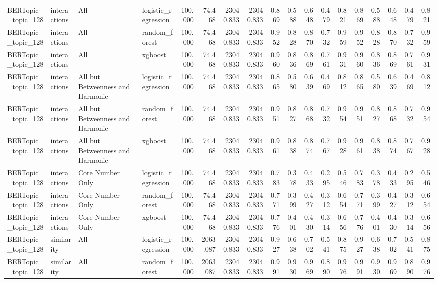 \begin{tabular}{llllrrrrrrrrrrrrrr}
BERTopic\_topic\_128 & interactions & All & logistic\_regression & 100.000 & 74.468 & 23040.833 & 23040.833 & 0.869 & 0.588 & 0.648 & 0.479 & 0.821 & 0.869 & 0.588 & 0.648 & 0.479 & 0.821 \\
BERTopic\_topic\_128 & interactions & All & random\_forest & 100.000 & 74.468 & 23040.833 & 23040.833 & 0.952 & 0.828 & 0.870 & 0.732 & 0.959 & 0.952 & 0.828 & 0.870 & 0.732 & 0.959 \\
BERTopic\_topic\_128 & interactions & All & xgboost & 100.000 & 74.468 & 23040.833 & 23040.833 & 0.960 & 0.836 & 0.869 & 0.761 & 0.931 & 0.960 & 0.836 & 0.869 & 0.761 & 0.931 \\
BERTopic\_topic\_128 & interactions & All but Betweenness and Harmonic & logistic\_regression & 100.000 & 74.468 & 23040.833 & 23040.833 & 0.865 & 0.580 & 0.639 & 0.469 & 0.812 & 0.865 & 0.580 & 0.639 & 0.469 & 0.812 \\
BERTopic\_topic\_128 & interactions & All but Betweenness and Harmonic & random\_forest & 100.000 & 74.468 & 23040.833 & 23040.833 & 0.951 & 0.827 & 0.868 & 0.732 & 0.954 & 0.951 & 0.827 & 0.868 & 0.732 & 0.954 \\
BERTopic\_topic\_128 & interactions & All but Betweenness and Harmonic & xgboost & 100.000 & 74.468 & 23040.833 & 23040.833 & 0.961 & 0.838 & 0.874 & 0.767 & 0.928 & 0.961 & 0.838 & 0.874 & 0.767 & 0.928 \\
BERTopic\_topic\_128 & interactions & Core Number Only & logistic\_regression & 100.000 & 74.468 & 23040.833 & 23040.833 & 0.783 & 0.378 & 0.433 & 0.295 & 0.546 & 0.783 & 0.378 & 0.433 & 0.295 & 0.546 \\
BERTopic\_topic\_128 & interactions & Core Number Only & random\_forest & 100.000 & 74.468 & 23040.833 & 23040.833 & 0.771 & 0.399 & 0.427 & 0.312 & 0.654 & 0.771 & 0.399 & 0.427 & 0.312 & 0.654 \\
BERTopic\_topic\_128 & interactions & Core Number Only & xgboost & 100.000 & 74.468 & 23040.833 & 23040.833 & 0.776 & 0.401 & 0.430 & 0.314 & 0.656 & 0.776 & 0.401 & 0.430 & 0.314 & 0.656 \\
BERTopic\_topic\_128 & similarity & All & logistic\_regression & 100.000 & 2063.087 & 23040.833 & 23040.833 & 0.927 & 0.638 & 0.702 & 0.541 & 0.875 & 0.927 & 0.638 & 0.702 & 0.541 & 0.875 \\
BERTopic\_topic\_128 & similarity & All & random\_forest & 100.000 & 2063.087 & 23040.833 & 23040.833 & 0.991 & 0.930 & 0.969 & 0.890 & 0.976 & 0.991 & 0.930 & 0.969 & 0.890 & 0.976 \\

\end{tabular}
